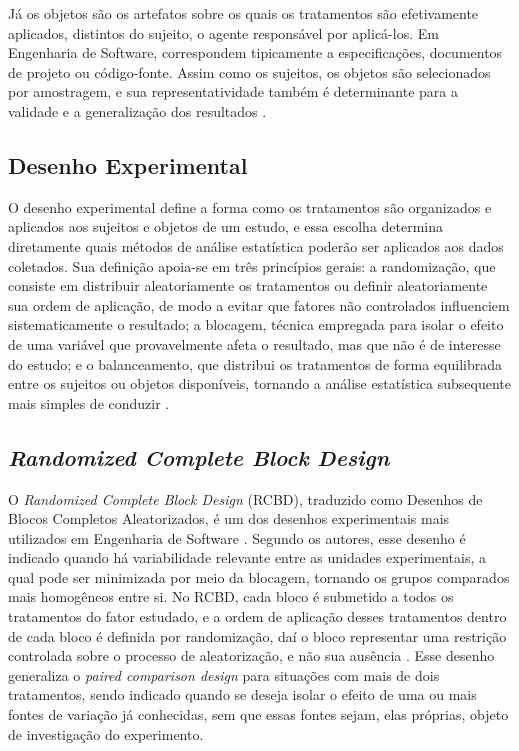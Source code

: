 Já os objetos são os artefatos sobre os quais os tratamentos são efetivamente aplicados, distintos do sujeito, o agente responsável por aplicá-los. Em Engenharia de Software, correspondem tipicamente a especificações, documentos de projeto ou código-fonte. Assim como os sujeitos, os objetos são selecionados por amostragem, e sua representatividade também é determinante para a validade e a generalização dos resultados .

\subsection{Desenho Experimental}

O desenho experimental define a forma como os tratamentos são organizados e aplicados aos sujeitos e objetos de um estudo, e essa escolha determina diretamente quais métodos de análise estatística poderão ser aplicados aos dados coletados. Sua definição apoia-se em três princípios gerais: a randomização, que consiste em distribuir aleatoriamente os tratamentos ou definir aleatoriamente sua ordem de aplicação, de modo a evitar que fatores não controlados influenciem sistematicamente o resultado; a blocagem, técnica empregada para isolar o efeito de uma variável que provavelmente afeta o resultado, mas que não é de interesse do estudo; e o balanceamento, que distribui os tratamentos de forma equilibrada entre os sujeitos ou objetos disponíveis, tornando a análise estatística subsequente mais simples de conduzir .

\subsection{\textit{Randomized Complete Block Design}}

O \textit{Randomized Complete Block Design} (RCBD), traduzido como Desenhos de Blocos Completos Aleatorizados, é um dos desenhos experimentais mais utilizados em Engenharia de Software . Segundo os autores, esse desenho é indicado quando há variabilidade relevante entre as unidades experimentais, a qual pode ser minimizada por meio da blocagem, tornando os grupos comparados mais homogêneos entre si. No RCBD, cada bloco é submetido a todos os tratamentos do fator estudado, e a ordem de aplicação desses tratamentos dentro de cada bloco é definida por randomização, daí o bloco representar uma restrição controlada sobre o processo de aleatorização, e não sua ausência . Esse desenho generaliza o \textit{paired comparison design} para situações com mais de dois tratamentos, sendo indicado quando se deseja isolar o efeito de uma ou mais fontes de variação já conhecidas, sem que essas fontes sejam, elas próprias, objeto de investigação do experimento.

